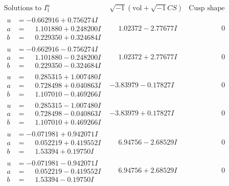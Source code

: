 \documentclass[1p]{elsarticle_modified}
\theoremstyle{definition}
\newcommand{\I}{\sqrt{-1}}
\begin{document}
$$\begin{array}{c|c|c}  
\text{Solutions to }I^u_{1}& \I (\text{vol} + \sqrt{-1}CS) & \text{Cusp shape}\\
 \hline 
\begin{aligned}
u &= -0.662916 + 0.756274 I \\
a &= \phantom{-}1.101880 + 0.248200 I \\
b &= \phantom{-}0.229350 + 0.324684 I\end{aligned}
 & \phantom{-}1.02372 - 2.77677 I & \phantom{-0.000000 } 0 \\ \hline\begin{aligned}
u &= -0.662916 - 0.756274 I \\
a &= \phantom{-}1.101880 - 0.248200 I \\
b &= \phantom{-}0.229350 - 0.324684 I\end{aligned}
 & \phantom{-}1.02372 + 2.77677 I & \phantom{-0.000000 } 0 \\ \hline\begin{aligned}
u &= \phantom{-}0.285315 + 1.007480 I \\
a &= \phantom{-}0.728498 + 0.040863 I \\
b &= \phantom{-}1.107010 - 0.469266 I\end{aligned}
 & -3.83979 - 0.17827 I & \phantom{-0.000000 } 0 \\ \hline\begin{aligned}
u &= \phantom{-}0.285315 - 1.007480 I \\
a &= \phantom{-}0.728498 - 0.040863 I \\
b &= \phantom{-}1.107010 + 0.469266 I\end{aligned}
 & -3.83979 + 0.17827 I & \phantom{-0.000000 } 0 \\ \hline\begin{aligned}
u &= -0.071981 + 0.942071 I \\
a &= \phantom{-}0.052219 + 0.419552 I \\
b &= \phantom{-}1.53394 + 0.19750 I\end{aligned}
 & \phantom{-}6.94756 - 2.68529 I & \phantom{-0.000000 } 0 \\ \hline\begin{aligned}
u &= -0.071981 - 0.942071 I \\
a &= \phantom{-}0.052219 - 0.419552 I \\
b &= \phantom{-}1.53394 - 0.19750 I\end{aligned}
 & \phantom{-}6.94756 + 2.68529 I & \phantom{-0.000000 } 0 \\ \hline\begin{aligned}

\end{aligned}
\end{array}$$
\end{document}
